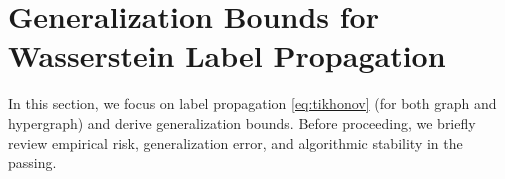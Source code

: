 \documentclass[letterpaper]{article} %
\begin{document}
\section{Generalization Bounds for Wasserstein Label Propagation}
In this section, we focus on label propagation \eqref{eq:tikhonov} (for both graph and hypergraph) and derive generalization bounds. Before proceeding, we briefly review empirical risk, generalization error, and algorithmic stability in the passing.

\end{document}
